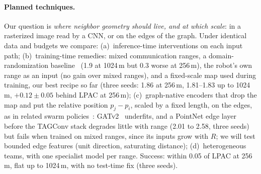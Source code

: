 \documentclass{article}
\begin{document}
\paragraph{Planned techniques.}
Our question is \emph{where neighbor geometry should live, and at which scale}: in a rasterized image read by a CNN, or on the edges of the graph. Under identical data and budgets we compare: (a)~inference-time interventions on each input path; (b)~training-time remedies: mixed communication ranges, a domain-randomization baseline~\citep{tobin2017domain} (1.9 at 1024\,m but 0.3 worse at 256\,m), the robot's own range as an input (no gain over mixed ranges), and a fixed-scale map used during training, our best recipe so far (three seeds: 1.86 at 256\,m, 1.81--1.83 up to 1024\,m, $+0.12\pm0.05$ behind LPAC at 256\,m); (c)~graph-native encoders that drop the map and put the relative position $p_j-p_i$, scaled by a fixed length, on the edges, as in related swarm policies~\citep{muthusamy2024generalizability,owerko2025mast}: GATv2~\citep{brody2022gatv2} underfits, and a PointNet edge layer~\citep{qi2017pointnetpp} before the TAGConv stack degrades little with range (2.01 to 2.58, three seeds) but fails when trained on mixed ranges, since its inputs grow with $R$; we will test bounded edge features (unit direction, saturating distance); (d)~heterogeneous teams, with one specialist model per range. Success: within 0.05 of LPAC at 256\,m, flat up to 1024\,m, with no test-time fix (three seeds).


\small

\end{document}
